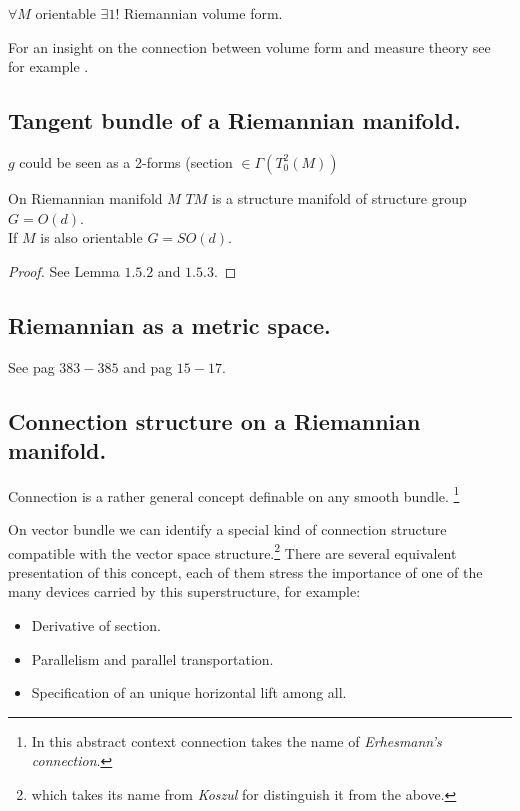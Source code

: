 \documentclass[a4paper,12pt]{scrartcl}    %
\begin{document}
\begin{theorem}
$\forall M$ orientable $\exists1!$ Riemannian volume form.
\end{theorem}

\begin{observation}
For an insight on the connection between volume form and measure theory see for example \cite{Abraham1978}.
\end{observation}

\subsection{Tangent bundle of a Riemannian manifold.}
\begin{observation}
$g$ could be seen as a 2-forms (section $\in \Gamma(T^2_0(M))$
\end{observation}

\begin{definition}
\end{definition}

\begin{theorem}
 On Riemannian manifold $M$ $TM$ is a structure manifold of structure group $G= O(d)$.
 \\
 If $M$ is also orientable $G= SO(d)$.
\end{theorem}
\begin{proof}
 See \cite{Jost2005} Lemma $1.5.2$ and $1.5.3$.
\end{proof}

\subsection{Riemannian as a metric space.}
 See \cite{Abate2011} pag $383-385$  and \cite{Jost2005} pag $15-17$.

\subsection{Connection structure on a Riemannian manifold.}
 Connection is a rather general concept definable on any smooth bundle. \footnote{In this abstract context connection takes the name of \emph{Erhesmann's connection}.}
 
 On vector bundle we can identify a special kind of connection structure compatible with the vector space structure.\footnote{which takes its name from \emph{Koszul} for distinguish it from the above.}
 There are several equivalent presentation of this concept, each of them stress the importance of one of the many devices carried by this superstructure, for example:
 \begin{itemize}
 	\item Derivative of section.
 	\item Parallelism and parallel transportation.
 	\item Specification of an unique horizontal lift among all.
 \end{itemize}
 
\end{document}
